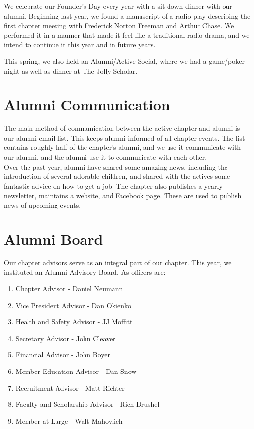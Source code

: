     We celebrate our Founder’s Day every year with a sit down dinner with our alumni. Beginning last year, we found a manuscript of a radio play describing the first chapter meeting with Frederick Norton Freeman and Arthur Chase. We performed it in a manner that made it feel like a traditional radio drama, and we intend to continue it this year and in future years.
    
    This spring, we also held an Alumni/Active Social, where we had a game/poker night as well as dinner at The Jolly Scholar.
    
  \section*{Alumni Communication}
    The main method of communication between the active chapter and alumni is our alumni email list. This keeps alumni informed of all chapter events. The list contains roughly half of the chapter’s alumni, and we use it communicate with our alumni, and the alumni use it to communicate with each other. \\

    Over the past year, alumni have shared some amazing news, including the introduction of several adorable children, and shared with the actives some fantastic advice on how to get a job. The chapter also publishes a yearly newsletter, maintains a website, and Facebook page. These are used to publish news of upcoming events.
    
  \section*{Alumni Board}
    Our chapter advisors serve as an integral part of our chapter. This year, we instituted an Alumni Advisory Board. As officers are:
      \begin{enumerate}
       \item Chapter Advisor - Daniel Neumann
       \item Vice President Advisor - Dan Okienko
       \item Health and Safety Advisor - JJ Moffitt
       \item Secretary Advisor - John Cleaver
	   \item Financial Advisor - John Boyer
       \item Member Education Advisor - Dan Snow
       \item Recruitment Advisor - Matt Richter
       \item Faculty and Scholarship Advisor - Rich Drushel
       \item Member-at-Large - Walt Mahovlich
       
      \end{enumerate}

